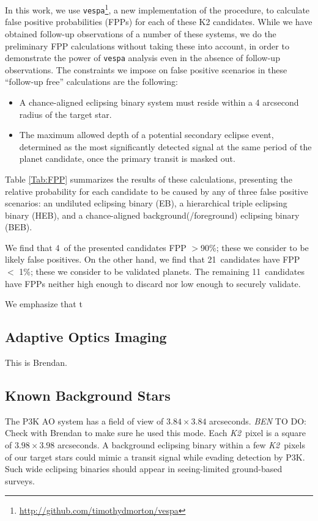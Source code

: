 \documentclass{emulateapj}
\newcommand{\project}[1]{\textsl{#1}}
\newcommand{\KT}{\project{K2}}
\newcommand{\todo}[3]{{\color{#2} \emph{#1} TO DO: #3}}
\newcommand{\btmtodo}[1]{\todo{BEN}{red}{#1}}
\newcommand{\Nfp}{4}
\newcommand{\Nvalidated}{21}
\newcommand{\Nlimbo}{11}
\begin{document}
In this work, we use
\texttt{vespa}\footnote{\url{http://github.com/timothydmorton/vespa}},
a new implementation of the \citet{Morton12} procedure, to calculate
false positive probabilities (FPPs) for each of these K2 candidates.
While we have obtained follow-up observations of a number of these systems,
we do the preliminary FPP calculations without taking these into account,
in order to demonstrate the power of \texttt{vespa} analysis
even in the absence of follow-up observations.
The constraints we impose on false positive scenarios in these
``follow-up free'' calculations are the following:
\begin{itemize}
\item A chance-aligned eclipsing binary system must reside within
a 4 arcsecond radius of the target star.
\item The maximum allowed depth of a potential secondary eclipse event,
determined as the most significantly detected signal at the same
period of the planet candidate, once the primary transit is masked out.
\end{itemize}


Table \ref{Tab:FPP} summarizes the results of these
calculations, presenting the relative probability for each candidate
to be caused by any of three false positive scenarios: an undiluted
eclipsing binary (EB), a hierarchical triple eclipsing binary (HEB),
and a chance-aligned background(/foreground) eclipsing binary (BEB).


We find that \Nfp\ of the presented candidates FPP $>$90\%;
these we consider to be likely false positives.
On the other hand, we find that \Nvalidated\ candidates
have FPP $<$ 1\%; these we consider to be validated planets.
The remaining \Nlimbo\ candidates have FPPs neither high enough to discard
nor low enough to securely validate.

We emphasize that t

\subsection{Adaptive Optics Imaging}

This is Brendan.




\subsection{Known Background Stars}
The P3K AO system has a field of view of $3.84 \times 3.84$ arcseconds.
\btmtodo{Check with Brendan to make sure he used this mode}.
Each \KT\ pixel is a square of $3.98 \times 3.98$ arcseconds.
A background eclipsing binary within a few \KT\ pixels of our target
stars could mimic a transit signal while evading detection by P3K.
Such wide eclipsing binaries should appear in seeing-limited ground-based
surveys.
\end{document}
